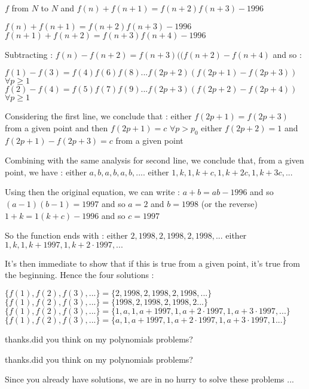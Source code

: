 \begin{solution}
	\begin{tcolorbox}$ f$ from $ N$ to $ N$ and $ f(n) + f(n + 1) = f(n + 2)f(n + 3) - 1996$\end{tcolorbox}

$ f(n) + f(n + 1) = f(n + 2)f(n + 3) - 1996$
$ f(n+1) + f(n + 2) = f(n + 3)f(n + 4) - 1996$

Subtracting : $ f(n)-f(n+2)=f(n+3)((f(n+2)-f(n+4)$ and so :

$ f(1)-f(3)=f(4)f(6)f(8)...f(2p+2)(f(2p+1)-f(2p+3))$ $ \forall p\ge 1$
$ f(2)-f(4)=f(5)f(7)f(9)...f(2p+3)(f(2p+2)-f(2p+4))$ $ \forall p\ge 1$

Considering the first line, we conclude that :
either $ f(2p+1)=f(2p+3)$ from a given point and then $ f(2p+1)=c$ $ \forall p>p_0$
either $ f(2p+2)=1$ and $ f(2p+1)-f(2p+3)=c$ from a given point 

Combining with the same analysis for second line, we conclude that, from a given point, we have :
either $ a,b,a,b,a,b,....$
either $ 1,k,1,k+c,1,k+2c,1,k+3c, ...$

Using then the original equation, we can write :
$ a+b=ab-1996$ and so $ (a-1)(b-1)=1997$ and so $ a=2$ and $ b=1998$ (or the reverse)
$ 1+k=1(k+c)-1996$ and so $ c=1997$

So the function ends with :
either $ 2,1998,2,1998,2,1998,...$
either $ 1,k,1,k+1997,1,k+2\cdot 1997, ...$

It's then immediate to show that if this is true from a given point, it's true from the beginning. Hence the four solutions :

$ \{f(1),f(2),f(3),...\}=\{2,1998,2,1998,2,1998, ...\}$
$ \{f(1),f(2),f(3),...\}=\{1998,2,1998,2,1998,2 ...\}$
$ \{f(1),f(2),f(3),...\}=\{1,a,1,a+1997,1,a+2\cdot 1997,1,a+3\cdot 1997, ...\}$
$ \{f(1),f(2),f(3),...\}=\{a,1,a+1997,1,a+2\cdot 1997,1,a+3\cdot 1997,1 ...\}$
\end{solution}



\begin{solution}
	thanks.did you think on my polynomials problems?
\end{solution}



\begin{solution}
	\begin{tcolorbox}thanks.did you think on my polynomials problems?\end{tcolorbox}

Since you already have solutions, we are in no hurry to solve these problems ...
\end{solution}



